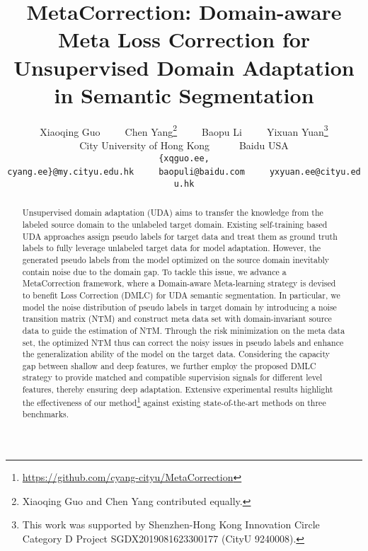 \documentclass[final]{cvpr}
\begin{document}
\title{MetaCorrection: Domain-aware Meta Loss Correction for Unsupervised Domain Adaptation in Semantic Segmentation}

\iffalse
\author{Xiaoqing Guo\\
City University of Hong Kong\\
{\tt\small \{xqguo.ee, cyang.ee\}@my.cityu.edu.hk}
\and
Chen Yang\\
City University of Hong Kong
\and
Baopu Li\\
Baidu USA\\
{\tt\small baopuli@baidu.com}
\and
Yixuan Yuan\\
City University of Hong Kong\\
{\tt\small yxyuan.ee@cityu.edu.hk}
}
\fi

\author{Xiaoqing Guo~~~~~Chen Yang\thanks{Xiaoqing Guo and Chen Yang contributed equally.}~~~~~Baopu Li~~~~~Yixuan Yuan\thanks{This work was supported by Shenzhen-Hong Kong Innovation Circle Category D Project SGDX2019081623300177 (CityU 9240008).}
\\
City University of Hong Kong~~~~~~Baidu USA\\
{\tt\small \{xqguo.ee, cyang.ee\}@my.cityu.edu.hk}~~~~~{\tt\small baopuli@baidu.com}~~~~~{\tt\small yxyuan.ee@cityu.edu.hk}
}

\maketitle


\begin{abstract}
Unsupervised domain adaptation (UDA) aims to transfer the knowledge from the labeled source domain to the unlabeled target domain. Existing self-training based UDA approaches assign pseudo labels for target data and treat them as ground truth labels to fully leverage unlabeled target data for model adaptation. However, the generated pseudo labels from the model optimized on the source domain inevitably contain noise due to the domain gap. To tackle this issue, we advance a MetaCorrection framework, where a Domain-aware Meta-learning strategy is devised to benefit Loss Correction (DMLC) for UDA semantic segmentation. In particular, we model the noise distribution of pseudo labels in target domain by introducing a noise transition matrix (NTM) and construct meta data set with domain-invariant source data to guide the estimation of NTM. Through the risk minimization on the meta data set, the optimized NTM thus can correct the noisy issues in pseudo labels and enhance the generalization ability of the model on the target data. Considering the capacity gap between shallow and deep features, we further employ the proposed DMLC strategy to provide matched and compatible supervision signals for different level features, thereby ensuring deep adaptation. Extensive experimental results highlight the effectiveness of our method\footnote{\url{https://github.com/cyang-cityu/MetaCorrection}} against existing state-of-the-art methods on three benchmarks.
\end{abstract}
\end{document}
